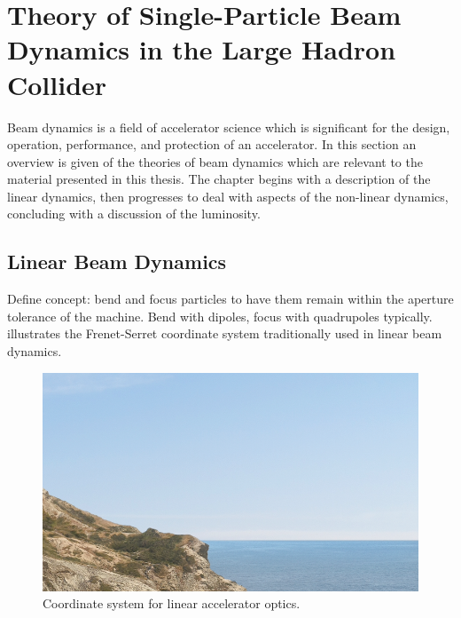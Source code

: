 \chapter{Theory of Single-Particle Beam Dynamics in the Large Hadron Collider} %

\label{Chapter:Theory} %


Beam dynamics is a field of accelerator science which is significant for the design, operation, performance, and protection of an accelerator. 
In this section an overview is given of the theories of beam dynamics which are relevant to the material presented in this thesis.
The chapter begins with a description of the linear dynamics, then progresses to deal with aspects of the non-linear dynamics, concluding with a discussion of the luminosity.


\section{Linear Beam Dynamics}

Define concept: bend and focus particles to have them remain within the aperture tolerance of the machine.
Bend with dipoles, focus with quadrupoles typically.
 illustrates the Frenet-Serret coordinate system traditionally used in linear beam dynamics.
\bigbreak

\begin{figure}[!htb]
    \begin{center}
    \includegraphics[width = 0.7\linewidth]{Figures/placeholder.png}
    \caption{Coordinate system for linear accelerator optics.}
    \label{figure:frenet_system}
    \end{center}
\end{figure}

